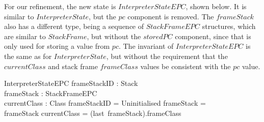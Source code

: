 For our refinement, the new state is $InterpreterStateEPC$, shown
below.
It is similar to $InterpreterState$, but the $pc$ component is
removed.
The $frameStack$ also has a different type, being a sequence of
$StackFrameEPC$ structures, which are similar to $StackFrame$, but
without the $storedPC$ component, since that is only used for storing
a value from $pc$.
The invariant of $InterpreterStateEPC$ is the same as for
$InterpreterState$, but without the requirement that the
$currentClass$ and stack frame $frameClass$ values be consistent with
the $pc$ value.
\begin{schema}{InterpreterStateEPC}
  frameStackID : Stack \\
  frameStack : \seq StackFrameEPC \\
  currentClass : Class
\where
  frameStackID = Uninitialised \implies frameStack = \emptyset \\
  frameStack \neq \emptyset \implies currentClass = (last~frameStack).frameClass
\end{schema}


